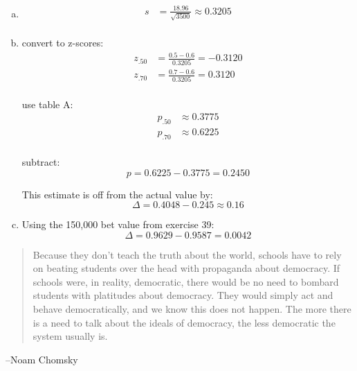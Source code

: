 \documentclass[letterpaper, landscape]{exam}
\begin{document}
\begin{description}
\begin{enumerate}[(a)]
          \item
            \begin{align*}
              s &= \frac{18.96}{\sqrt{3500}} \approx \boxed{ 0.3205 } \\
            \end{align*}
            
          \item
            convert to z-scores:
            \begin{align*}
              z_{.50} &= \frac{0.5 - 0.6}{0.3205} = -0.3120 \\
              z_{.70} &= \frac{0.7 - 0.6}{0.3205} = 0.3120 \\
            \end{align*}

            use table A:
            \begin{align*}
              p_{.50} & \approx 0.3775 \\
              p_{.70} & \approx 0.6225 \\
            \end{align*}

            subtract:
            \[
              p = 0.6225 - 0.3775 = 0.2450
            \]

            This estimate is off from the actual value by:
            \[
              \Delta = 0.4048 - 0.245 \approx \boxed{ 0.16 }
            \]
            
          \item Using the 150,000 bet value from exercise 39:
            \[
              \Delta = 0.9629 - 0.9587 = \boxed{ 0.0042 }
            \]

        \end{enumerate}
  \end{description}

  \else
    \vspace{10 cm}
    \begin{quote}
      \begin{em}
        Because they don't teach the truth about the world, schools have to rely on
        beating students over the head with propaganda about democracy. If schools were,
        in reality, democratic, there would be no need to bombard students with
        platitudes about democracy. They would simply act and behave democratically, and
        we know this does not happen. The more there is a need to talk about the ideals
        of democracy, the less democratic the system usually is.
      \end{em}
    \end{quote}
    \hspace{1 cm} --Noam Chomsky
  \fi
\end{document}

